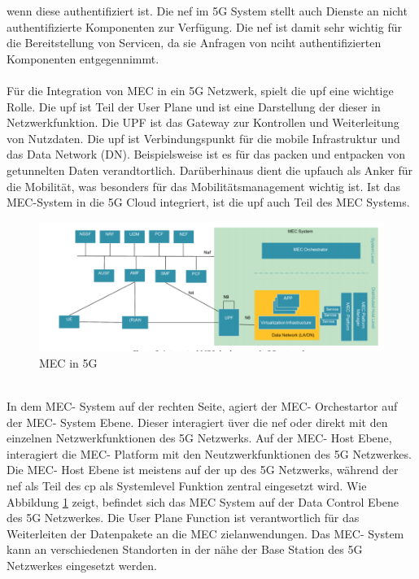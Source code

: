 \documentclass[runningheads]{llncs}
\numberwithin{figure}{section}
\begin{document}
wenn diese au­then­ti­fi­zie­rt ist. Die \acrfull{nef} im 5G System stellt auch Dienste an nicht au­then­ti­fi­zie­rte Komponenten 
zur Verfügung. Die \acrshort{nef} ist damit sehr wichtig für die Bereitstellung von Servicen, da sie Anfragen von nciht authentifizierten Komponenten
entgegennimmt.
\\
\\
Für die Integration von MEC in ein 5G Netzwerk, spielt die \acrfull{upf} eine wichtige Rolle. Die \acrshort{upf} ist Teil der User Plane
und ist eine Darstellung der dieser in Netzwerkfunktion. Die UPF ist das Gateway zur Kontrollen und Weiterleitung von Nutzdaten. 
Die \acrshort{upf} ist Verbindungspunkt für die mobile Infrastruktur und das Data Network (DN). Beispielsweise ist es für das packen und entpacken von 
getunnelten Daten verandtortlich. Darüberhinaus dient die \acrshort{upf}auch als Anker für die Mobilität, was besonders für das Mobilitätsmanagement wichtig ist.
\cite{Leitfaden5GCampusnetze2020}
Ist das MEC-System in die 5G Cloud integriert, ist die \acrshort{upf} auch Teil des MEC Systems.
\begin{figure}
  \includegraphics[width=\linewidth]{images/5GMEC-System-Architecture2.png}
  \caption{MEC in 5G}
  \label{fig:sba2}
\end{figure}
\\
In dem MEC- System auf der rechten Seite, agiert der MEC- Orchestartor auf der MEC- System Ebene. Dieser interagiert üver die \acrshort{nef} oder
direkt mit den einzelnen Netzwerkfunktionen des 5G Netzwerks. Auf der MEC- Host Ebene, interagiert die MEC- Platform mit den Neutzwerkfunktionen  des 5G Netzwerkes.
Die MEC- Host Ebene ist meistens auf der \acrshort{up} des 5G Netzwerks, während der \acrshort{nef} als Teil des \acrshort{cp} als Systemlevel 
Funktion zentral eingesetzt wird.
Wie Abbildung \ref{fig:sba2} zeigt, befindet sich das MEC System auf der Data Control Ebene des 5G Netzwerkes. 
Die User Plane Function ist verantwortlich für das Weiterleiten der Datenpakete an die MEC zielanwendungen. 
Das MEC- System kann an verschiedenen Standorten in der nähe der Base Station des 5G Netzwerkes eingesetzt werden. 
\end{document}
